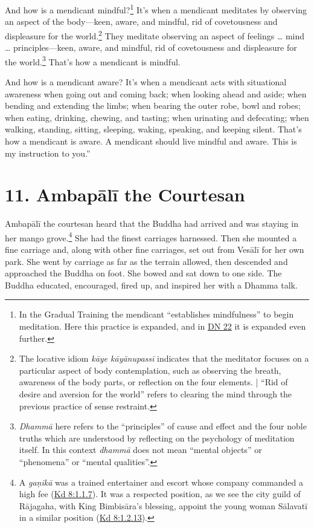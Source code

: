 \documentclass[12pt,openany]{book}%
\begin{document}
And how is a mendicant mindful?\footnote{In the Gradual Training the mendicant “establishes mindfulness” to begin meditation. Here this practice is expanded, and in \href{https://suttacentral.net/dn22/en/sujato}{DN 22} it is expanded even further. } It’s when a mendicant meditates by observing an aspect of the body—keen, aware, and mindful, rid of covetousness and displeasure for the world.\footnote{The locative idiom \textit{\textsanskrit{kāye} \textsanskrit{kāyānupassī}} indicates that the meditator focuses on a particular aspect of body contemplation, such as observing the breath, awareness of the body parts, or reflection on the four elements. | “Rid of desire and aversion for the world” refers to clearing the mind through the previous practice of sense restraint. } They meditate observing an aspect of feelings … mind … principles—keen, aware, and mindful, rid of covetousness and displeasure for the world.\footnote{\textit{\textsanskrit{Dhammā}} here refers to the “principles” of cause and effect and the four noble truths which are understood by reflecting on the psychology of meditation itself. In this context \textit{\textsanskrit{dhammā}} does not mean “mental objects” or “phenomena” or “mental qualities”. } That’s how a mendicant is mindful. 

And how is a mendicant aware? It’s when a mendicant acts with situational awareness when going out and coming back; when looking ahead and aside; when bending and extending the limbs; when bearing the outer robe, bowl and robes; when eating, drinking, chewing, and tasting; when urinating and defecating; when walking, standing, sitting, sleeping, waking, speaking, and keeping silent. That’s how a mendicant is aware. A mendicant should live mindful and aware. This is my instruction to you.” 

\section*{11. \textsanskrit{Ambapālī} the Courtesan }

\textsanskrit{Ambapālī} the courtesan heard that the Buddha had arrived and was staying in her mango grove.\footnote{A \textit{\textsanskrit{gaṇikā}} was a trained entertainer and escort whose company commanded a high fee (\href{https://suttacentral.net/pli-tv-kd8/en/sujato\#1.1.7}{Kd 8:1.1.7}). It was a respected position, as we see the city guild of \textsanskrit{Rājagaha}, with King \textsanskrit{Bimbisāra}’s blessing, appoint the young woman \textsanskrit{Sālavatī} in a similar position (\href{https://suttacentral.net/pli-tv-kd8/en/sujato\#1.2.13}{Kd 8:1.2.13}). } She had the finest carriages harnessed. Then she mounted a fine carriage and, along with other fine carriages, set out from \textsanskrit{Vesālī} for her own park. She went by carriage as far as the terrain allowed, then descended and approached the Buddha on foot. She bowed and sat down to one side. The Buddha educated, encouraged, fired up, and inspired her with a Dhamma talk. 
\end{document}

